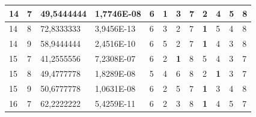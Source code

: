 \documentclass[conference]{IEEEtran}
\begin{document}
\begin{table}[]
\begin{tabular}{|llll|llllllll|}
		\multicolumn{1}{|l|}{14}  & \multicolumn{1}{l|}{7}         & \multicolumn{1}{l|}{49,5444444}    & 1,7746E-08 & \multicolumn{1}{l|}{6}   & \multicolumn{1}{l|}{\textbf{1}} & \multicolumn{1}{l|}{3}          & \multicolumn{1}{l|}{7}   & \multicolumn{1}{l|}{2}          & \multicolumn{1}{l|}{4}          & \multicolumn{1}{l|}{5}          & 8                      \\ \hline
		\multicolumn{1}{|l|}{14}  & \multicolumn{1}{l|}{8}         & \multicolumn{1}{l|}{72,8333333}    & 3,9456E-13 & \multicolumn{1}{l|}{6}   & \multicolumn{1}{l|}{3}          & \multicolumn{1}{l|}{2}          & \multicolumn{1}{l|}{7}   & \multicolumn{1}{l|}{\textbf{1}} & \multicolumn{1}{l|}{5}          & \multicolumn{1}{l|}{4}          & 8                      \\ \hline
		\multicolumn{1}{|l|}{14}  & \multicolumn{1}{l|}{9}         & \multicolumn{1}{l|}{58,9444444}    & 2,4516E-10 & \multicolumn{1}{l|}{6}   & \multicolumn{1}{l|}{5}          & \multicolumn{1}{l|}{2}          & \multicolumn{1}{l|}{7}   & \multicolumn{1}{l|}{\textbf{1}} & \multicolumn{1}{l|}{4}          & \multicolumn{1}{l|}{3}          & 8                      \\ \hline
		\multicolumn{1}{|l|}{15}  & \multicolumn{1}{l|}{7}         & \multicolumn{1}{l|}{41,2555556}    & 7,2308E-07 & \multicolumn{1}{l|}{6}   & \multicolumn{1}{l|}{2}          & \multicolumn{1}{l|}{\textbf{1}} & \multicolumn{1}{l|}{8}   & \multicolumn{1}{l|}{5}          & \multicolumn{1}{l|}{4}          & \multicolumn{1}{l|}{3}          & 7                      \\ \hline
		\multicolumn{1}{|l|}{15}  & \multicolumn{1}{l|}{8}         & \multicolumn{1}{l|}{49,4777778}    & 1,8289E-08 & \multicolumn{1}{l|}{5}   & \multicolumn{1}{l|}{4}          & \multicolumn{1}{l|}{6}          & \multicolumn{1}{l|}{8}   & \multicolumn{1}{l|}{2}          & \multicolumn{1}{l|}{\textbf{1}} & \multicolumn{1}{l|}{3}          & 7                      \\ \hline
		\multicolumn{1}{|l|}{15}  & \multicolumn{1}{l|}{9}         & \multicolumn{1}{l|}{50,6777778}    & 1,0631E-08 & \multicolumn{1}{l|}{6}   & \multicolumn{1}{l|}{2}          & \multicolumn{1}{l|}{5}          & \multicolumn{1}{l|}{7}   & \multicolumn{1}{l|}{\textbf{1}} & \multicolumn{1}{l|}{3}          & \multicolumn{1}{l|}{4}          & 8                      \\ \hline
		\multicolumn{1}{|l|}{16}  & \multicolumn{1}{l|}{7}         & \multicolumn{1}{l|}{62,2222222}    & 5,4259E-11 & \multicolumn{1}{l|}{6}   & \multicolumn{1}{l|}{2}          & \multicolumn{1}{l|}{3}          & \multicolumn{1}{l|}{8}   & \multicolumn{1}{l|}{\textbf{1}} & \multicolumn{1}{l|}{4}          & \multicolumn{1}{l|}{5}          & 7                      \\ \hline

\end{tabular}
\end{table}
\end{document}
